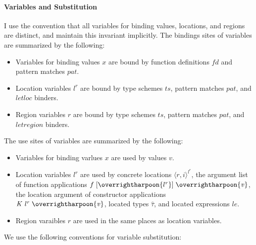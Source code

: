 \documentclass[showabstract,showacknowledgments,showpreface,showdedication,school]{iuphd}
\theoremstyle{nonumberplain}
\newcommand{\keywd}[1]{\mathit{#1}}
\newcommand{\skeywd}[1]{\mathit{#1}}
\newcommand{\FD}{\keywd{fd}}
\newcommand{\DC}{\keywd{K}}
\newcommand{\hTYP}{\keywd{\hat{\tau}}}
\newcommand{\var}{\svar}
\newcommand{\svar}{x}
\newcommand{\fvar}{\sfvar}
\newcommand{\sfvar}{f}
\newcommand{\loc}{\skeywd{l}}
\newcommand{\concreteloc}[3]{\ensuremath{\langle #1, #2 \rangle ^{#3}}}
\newcommand{\reg}{\skeywd{r}}
\newcommand{\LE}{\keywd{le}}
\newcommand{\fapp}[2]{\fvar \;[#1]\; #2}
\newcommand{\TS}{\keywd{ts}}
\newcommand{\pat}{\keywd{pat}}
\newcommand{\ind}{\keywd{i}}
\newcommand{\VAL}{\keywd{v}}
\newcommand{\datacon}[3]{\ensuremath{#1 \;#2 \;#3}}
\newcommand{\locreg}[2]{\ensuremath{{#1}^{#2}}}
\newcommand{\overharpoon}[1]{\overrightharpoon{#1}}
\begin{document}
\paragraph{Variables and Substitution}
I use the convention that all variables for binding values,
locations, and regions are distinct, and maintain this invariant
implicitly.
The bindings sites of variables are summarized by the following:
\begin{itemize}
\item Variables for binding values $\var$ are bound by function definitions
$\FD$ and pattern matches $\pat$.

\item Location variables $\locreg{\loc}{\reg}$ are bound by type schemes $\TS$, pattern matches
$\pat$, and $\keywd{letloc}$ binders.

\item Region variables $\reg$ are bound by type schemes $\TS$, pattern
matches $\pat$, and $\keywd{letregion}$ binders.
\end{itemize}
The use sites of variables are summarized by the following:
\begin{itemize}
\item Variables for binding varlues $\var$ are used by values $\VAL$.

\item Location variables $\locreg{\loc}{\reg}$ are used by concrete locations $\concreteloc{\reg}{\ind}{\locreg{\loc}{\reg}}$,
the argument list of function applications
$\fapp{\overharpoon{\locreg{l}{r}}}{\overharpoon{\VAL}}$, the location
argument of constructor applications
$\datacon{\DC}{\keywd{\locreg{\loc}{\reg}}}{\overharpoon{\VAL}}$,
located types $\hTYP$, and located expressions $\LE$.

\item Region varaibles $\reg$ are used in the same places as location variables.
\end{itemize}
We use the following conventions for variable substitution:
\end{document}
